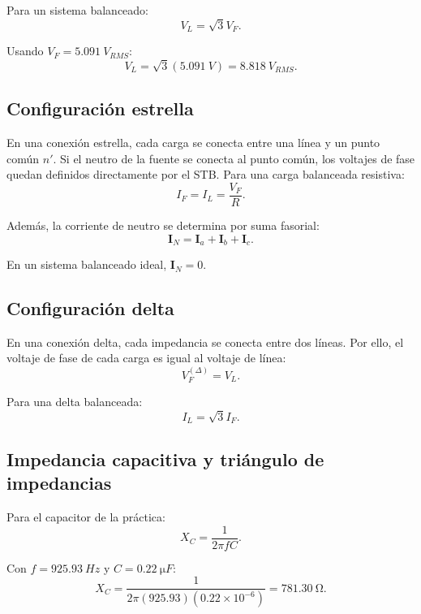 Para un sistema balanceado:
\begin{equation}
	V_L=\sqrt{3}V_F.
\end{equation}

Usando $V_F=\SI{5.091}{V_{RMS}}$:
\begin{equation}
	V_L=\sqrt{3}(\SI{5.091}{V})=\SI{8.818}{V_{RMS}}.
\end{equation}

\subsection{Configuración estrella}
En una conexión estrella, cada carga se conecta entre una línea y un punto común $n'$. Si el neutro de la fuente se conecta al punto común, los voltajes de fase quedan definidos directamente por el STB. Para una carga balanceada resistiva:
\begin{equation}
	I_F=I_L=\frac{V_F}{R}.
\end{equation}

Además, la corriente de neutro se determina por suma fasorial:
\begin{equation}
	\mathbf{I}_N=\mathbf{I}_a+\mathbf{I}_b+\mathbf{I}_c.
\end{equation}

En un sistema balanceado ideal, $\mathbf{I}_N=0$.

\subsection{Configuración delta}
En una conexión delta, cada impedancia se conecta entre dos líneas. Por ello, el voltaje de fase de cada carga es igual al voltaje de línea:
\begin{equation}
	V_F^{(\Delta)}=V_L.
\end{equation}

Para una delta balanceada:
\begin{equation}
	I_L=\sqrt{3}I_F.
\end{equation}

\subsection{Impedancia capacitiva y triángulo de impedancias}
Para el capacitor de la práctica:
\begin{equation}
	X_C=\frac{1}{2\pi f C}.
\end{equation}

Con $f=\SI{925.93}{Hz}$ y $C=\SI{0.22}{\micro F}$:
\begin{equation}
	X_C=\frac{1}{2\pi(925.93)(0.22\times 10^{-6})}=\SI{781.30}{\ohm}.
\end{equation}

